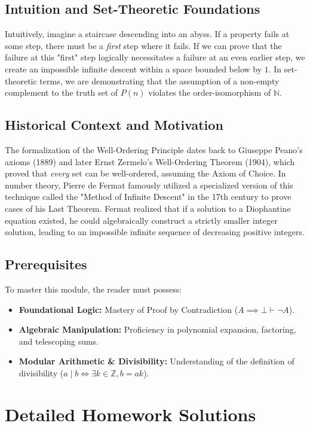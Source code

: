 \documentclass[11pt, a4paper]{article}
\theoremstyle{definition}
\theoremstyle{remark}
\newcommand{\N}{\mathbb{N}}
\newcommand{\Z}{\mathbb{Z}}
\begin{document}
\subsection{Intuition and Set-Theoretic Foundations}
Intuitively, imagine a staircase descending into an abyss. If a property fails at some step, there must be a \textit{first} step where it fails. If we can prove that the failure at this "first" step logically necessitates a failure at an even earlier step, we create an impossible infinite descent within a space bounded below by $1$. In set-theoretic terms, we are demonstrating that the assumption of a non-empty complement to the truth set of $P(n)$ violates the order-isomorphism of $\N$.

\subsection{Historical Context and Motivation}
The formalization of the Well-Ordering Principle dates back to Giuseppe Peano's axioms (1889) and later Ernst Zermelo's Well-Ordering Theorem (1904), which proved that \textit{every} set can be well-ordered, assuming the Axiom of Choice. In number theory, Pierre de Fermat famously utilized a specialized version of this technique called the "Method of Infinite Descent" in the 17th century to prove cases of his Last Theorem. Fermat realized that if a solution to a Diophantine equation existed, he could algebraically construct a strictly smaller integer solution, leading to an impossible infinite sequence of decreasing positive integers.

\subsection{Prerequisites}
To master this module, the reader must possess:
\begin{itemize}
    \item \textbf{Foundational Logic:} Mastery of Proof by Contradiction ($A \implies \bot \vdash \neg A$).
    \item \textbf{Algebraic Manipulation:} Proficiency in polynomial expansion, factoring, and telescoping sums.
    \item \textbf{Modular Arithmetic \& Divisibility:} Understanding of the definition of divisibility ($a \mid b \iff \exists k \in \Z, b = ak$).
\end{itemize}

\newpage
\section{Detailed Homework Solutions}
\end{document}
